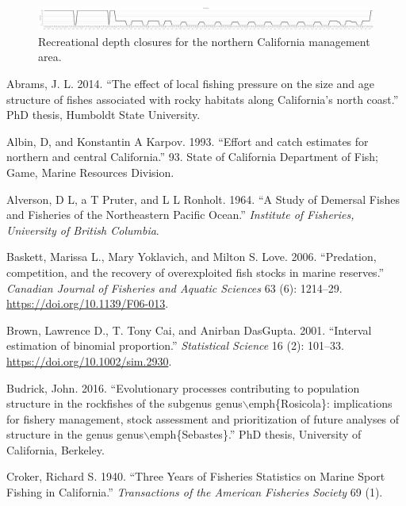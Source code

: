 \documentclass[
  english,
  a4paper,
]{article}
\newlength{\cslhangindent}
\newlength{\cslentryspacingunit} %
\newenvironment{CSLReferences}[2] %
 {%
  \setlength{\parindent}{0pt}
  \ifodd #1
  \let\oldpar\par
  \def\par{\hangindent=\cslhangindent\oldpar}
  \fi
  \setlength{\parskip}{#2\cslentryspacingunit}
 }%
 {}
\begin{document}
\begin{figure}
\centering
\includegraphics{figures/Regs_Northern.png}
\caption{Recreational depth closures for the northern California management area.\label{fig:rec-reg-n}}
\end{figure}

\hypertarget{refs}{}
\begin{CSLReferences}{1}{0}
\leavevmode{}%
Abrams, J. L. 2014. {``{The effect of local fishing pressure on the size and age structure of fishes associated with rocky habitats along California's north coast}.''} PhD thesis, Humboldt State University.

\leavevmode{}%
Albin, D, and Konstantin A Karpov. 1993. {``{Effort and catch estimates for northern and central California}.''} 93. State of California Department of Fish; Game, Marine Resources Division.

\leavevmode{}%
Alverson, D L, a T Pruter, and L L Ronholt. 1964. {``{A Study of Demersal Fishes and Fisheries of the Northeastern Pacific Ocean}.''} \emph{Institute of Fisheries, University of British Columbia}.

\leavevmode{}%
Baskett, Marissa L., Mary Yoklavich, and Milton S. Love. 2006. {``{Predation, competition, and the recovery of overexploited fish stocks in marine reserves}.''} \emph{Canadian Journal of Fisheries and Aquatic Sciences} 63 (6): 1214--29. \url{https://doi.org/10.1139/F06-013}.

\leavevmode{}%
Brown, Lawrence D., T. Tony Cai, and Anirban DasGupta. 2001. {``{Interval estimation of binomial proportion}.''} \emph{Statistical Science} 16 (2): 101--33. \url{https://doi.org/10.1002/sim.2930}.

\leavevmode{}%
Budrick, John. 2016. {``{Evolutionary processes contributing to population structure in the rockfishes of the subgenus genus\(\backslash\)emph{\{}Rosicola{\}}: implications for fishery management, stock assessment and prioritization of future analyses of structure in the genus genus\(\backslash\)emph{\{}Sebastes{\}}.}''} PhD thesis, University of California, Berkeley.

\leavevmode{}%
Croker, Richard S. 1940. {``{Three Years of Fisheries Statistics on Marine Sport Fishing in California}.''} \emph{Transactions of the American Fisheries Society} 69 (1).


\end{CSLReferences}
\end{document}
